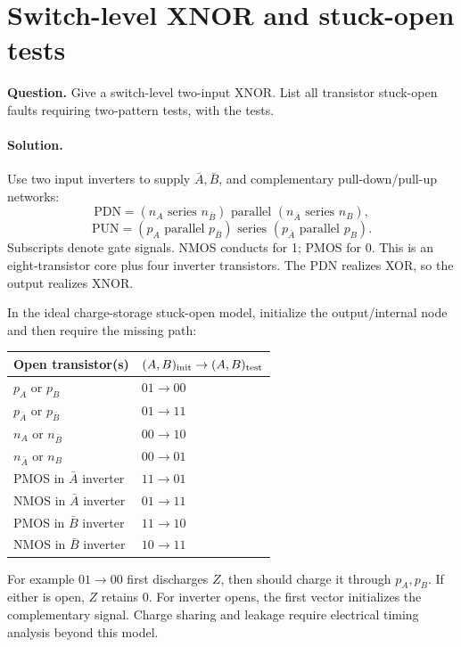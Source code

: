 \documentclass[11pt]{article}
\newcommand{\sol}{\paragraph{Solution.}}
\begin{document}
\section{Switch-level XNOR and stuck-open tests}
\textbf{Question.} Give a switch-level two-input XNOR. List all transistor
stuck-open faults requiring two-pattern tests, with the tests.
\sol Use two input inverters to supply $\bar A,\bar B$, and complementary
pull-down/pull-up networks:
\[
\mathrm{PDN}=(n_A\text{ series }n_{\bar B})
 \text{ parallel }(n_{\bar A}\text{ series }n_B),
\]
\[
\mathrm{PUN}=(p_A\text{ parallel }p_{\bar B})
 \text{ series }(p_{\bar A}\text{ parallel }p_B).
\]
Subscripts denote gate signals. NMOS conducts for 1; PMOS for 0.
This is an eight-transistor core plus four inverter transistors.
The PDN realizes XOR, so the output realizes XNOR.
\begin{center}\end{center}

In the ideal charge-storage stuck-open model, initialize the output/internal
node and then require the missing path:
\begin{center}\begin{tabular}{ll}\toprule Open transistor(s) & $(A,B)_{\rm init}\to(A,B)_{\rm test}$\\\midrule
$p_A$ or $p_B$ & $01\to00$\\
$p_{\bar A}$ or $p_{\bar B}$ & $01\to11$\\
$n_A$ or $n_{\bar B}$ & $00\to10$\\
$n_{\bar A}$ or $n_B$ & $00\to01$\\
PMOS in $\bar A$ inverter & $11\to01$\\
NMOS in $\bar A$ inverter & $01\to11$\\
PMOS in $\bar B$ inverter & $11\to10$\\
NMOS in $\bar B$ inverter & $10\to11$\\\bottomrule
\end{tabular}\end{center}
For example $01\to00$ first discharges $Z$, then should charge it through
$p_A,p_B$. If either is open, $Z$ retains 0.
For inverter opens, the first vector initializes the complementary signal.
Charge sharing and leakage require electrical timing analysis beyond this model.
\end{document}
